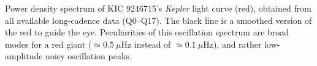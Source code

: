 \label{fig:seismo} Power density spectrum of KIC 9246715's \textit{Kepler} light curve (red), obtained from all available long-cadence data (Q0--Q17). The black line is a smoothed version of the red to guide the eye. Peculiarities of this oscillation spectrum are broad modes for a red giant ($\simeq0.5\ \mu$Hz instead of $\simeq0.1\ \mu$Hz), and rather low-amplitude noisy oscillation peaks. 
  
  
  
  
  
  
